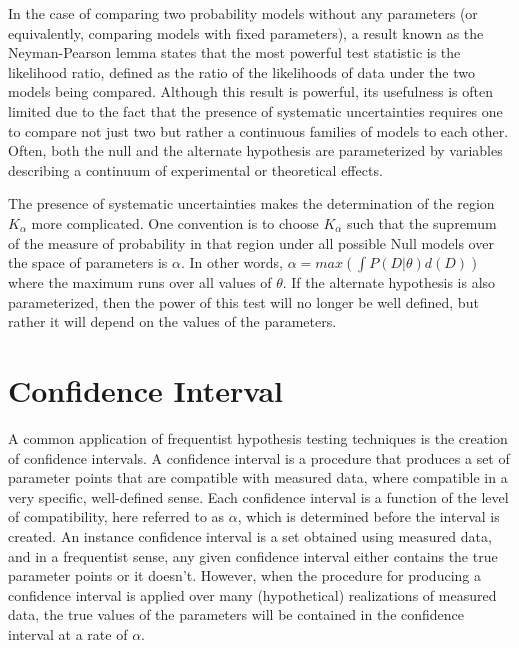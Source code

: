 In the case of comparing two probability models without any parameters (or equivalently, comparing models with fixed parameters), a result known as the Neyman-Pearson lemma states that the most powerful test statistic is the likelihood ratio, defined as the ratio of the likelihoods of data under the two models being compared.
Although this result is powerful, its usefulness is often limited due to the fact that the presence of systematic uncertainties requires one to compare not just two but rather a continuous families of models to each other.
Often, both the null and the alternate hypothesis are parameterized by variables describing a continuum of experimental or theoretical effects.

The presence of systematic uncertainties makes the determination of the region $K_{\alpha}$ more complicated.
One convention is to choose $K_{\alpha}$ such that the supremum of the measure of probability in that region under all possible Null models over the space of parameters is $\alpha$.
In other words, $\alpha = max( \int P(D|\theta) d(D) )$ where the maximum runs over all values of $\theta$.
If the alternate hypothesis is also parameterized, then the power of this test will no longer be well defined, but rather it will depend on the values of the parameters.


\section{Confidence Interval}

A common application of frequentist hypothesis testing techniques is the creation of confidence intervals.
A confidence interval is a procedure that produces a set of parameter points that are compatible with measured data, where compatible  in a very specific, well-defined sense.
Each confidence interval is a function of the level of compatibility, here referred to as $\alpha$, which is determined before the interval is created.
An instance confidence interval is a set obtained using measured data, and in a frequentist sense, any given confidence interval either contains the true parameter points or it doesn't.
However, when the procedure for producing a confidence interval is applied over many (hypothetical) realizations of measured data, the true values of the parameters will be contained in the confidence interval at a rate of $\alpha$.


